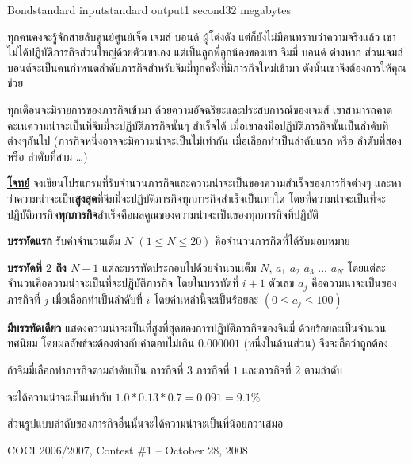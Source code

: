 \documentclass[11pt,a4paper]{article}
\begin{document}
\begin{problem}{Bond}{standard input}{standard output}{1 second}{32 megabytes}

ทุกคนคงจะรู้จักสายลับศูนย์ศูนย์เจ็ด เจมส์ บอนด์ ผู้โด่งดัง แต่ก็ยังไม่มีคนทราบว่าความจริงแล้ว เขาไม่ได้ปฏิบัติภารกิจส่วนใหญ่ด้วยตัวเขาเอง แต่เป็นลูกพี่ลูกน้องของเขา จิมมี่ บอนด์ ต่างหาก ส่วนเจมส์บอนด์จะเป็นคนกำหนดลำดับภารกิจสำหรับจิมมี่ทุกครั้งที่มีภารกิจใหม่เข้ามา ดังนั้นเขาจึงต้องการให้คุณช่วย

ทุกเดือนจะมีรายการของภารกิจเข้ามา ด้วยความอัจฉริยะและประสบการณ์ของเจมส์ เขาสามารถคาดคะเนความน่าจะเป็นที่จิมมี่จะปฏิบัติภารกิจนั้นๆ สำเร็จได้ เมื่อเขาลงมือปฏิบัติภารกิจนั้นเป็นลำดับที่ต่างๆกันไป (ภารกิจหนึ่งอาจจะมีความน่าจะเป็นไม่เท่ากัน เมื่อเลือกทำเป็นลำดับแรก หรือ ลำดับที่สอง หรือ ลำดับที่สาม …)

\bigskip
\underline{\textbf{โจทย์}}  จงเขียนโปรแกรมที่รับจำนวนภารกิจและความน่าจะเป็นของความสำเร็จของภารกิจต่างๆ และหาว่าความน่าจะเป็น\textbf{สูงสุด}ที่จิมมี่จะปฏิบัติภารกิจทุกภารกิจสำเร็จเป็นเท่าใด โดยที่ความน่าจะเป็นที่จะปฏิบัติภารกิจ\textbf{ทุกภารกิจ}สำเร็จคือผลคูณของความน่าจะเป็นของทุกภารกิจที่ปฏิบัติ

\InputFile

\textbf{บรรทัดแรก} รับค่าจำนวนเต็ม $N$ $(1 \leq N \leq 20)$ คือจำนวนภารกิตที่ได้รับมอบหมาย

\textbf{บรรทัดที่ $2$ ถึง $N+1$} แต่ละบรรทัดประกอบไปด้วยจำนวนเต็ม $N$, $a_1$ $a_2$ $a_3$ $...$ $a_N$ โดยแต่ละจำนวนคือความน่าจะเป็นที่จะปฏิบัติภารกิจ โดยในบรรทัดที่ $i+1$ ตัวเลข $a_j$ คือความน่าจะเป็นของภารกิจที่ $j$ เมื่อเลือกทำเป็นลำดับที่ $i$ โดยค่าเหล่านี้จะเป็นร้อยละ $(0 \leq a_j \leq 100)$

\OutputFile

\textbf{มีบรรทัดเดียว} แสดงความน่าจะเป็นที่สูงที่สุดของการปฏิบัติภารกิจของจิมมี่ ด้วยร้อยละเป็นจำนวนทศนิยม โดยผลลัพธ์จะต้องต่างกับคำตอบไม่เกิน $0.000001$ (หนึ่งในล้านส่วน) จึงจะถือว่าถูกต้อง

\Examples

\begin{example}
%
%
%
\end{example}

\Note 

ถ้าจิมมี่เลือกทำภารกิจตามลำดับเป็น ภารกิจที่ $3$ ภารกิจที่ $1$ และภารกิจที่ $2$ ตามลำดับ

จะได้ความน่าจะเป็นเท่ากับ $1.0 * 0.13 * 0.7 = 0.091 = 9.1\%$

ส่วนรูปแบบลำดับของภารกิจอื่นนั้นจะได้ความน่าจะเป็นที่น้อยกว่าเสมอ

\Source

COCI 2006/2007, Contest \#1 – October 28, 2008

\end{problem}
\end{document}
